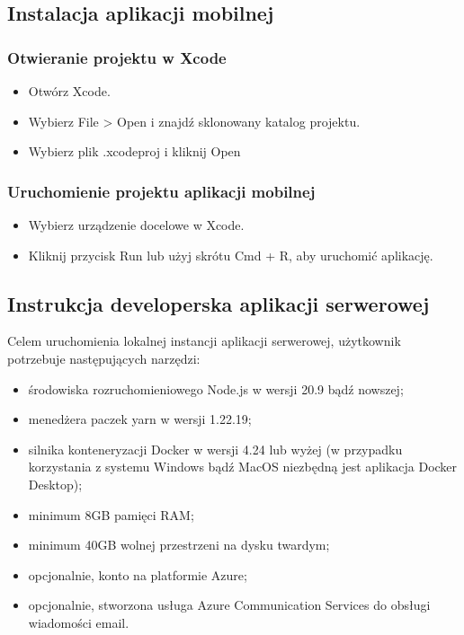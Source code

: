 \documentclass[12pt, a4paper, twoside, openany]{book}
\newcommand{\forceindent}{\leavevmode{\parindent=1.3em\indent}}
\begin{document}
{\subsection{Instalacja aplikacji mobilnej}

\subsubsection{Otwieranie projektu w Xcode }
\begin{itemize}[label=--]
    \item Otwórz Xcode.
    \item Wybierz File > Open i znajdź sklonowany katalog projektu.
    \item Wybierz plik .xcodeproj i kliknij Open
\end{itemize}

\subsubsection{Uruchomienie projektu aplikacji mobilnej}
\begin{itemize}
    \item Wybierz urządzenie docelowe w Xcode.
    \item Kliknij przycisk Run lub użyj skrótu Cmd + R, aby uruchomić aplikację.
\end{itemize}

\subsection{Instrukcja developerska aplikacji serwerowej}

\forceindent Celem uruchomienia lokalnej instancji aplikacji serwerowej, użytkownik potrzebuje następujących narzędzi:
\begin{itemize}[label=--]
    \item środowiska rozruchomieniowego Node.js w wersji 20.9 bądź nowszej;
    \item menedżera paczek yarn w wersji 1.22.19;
    \item silnika konteneryzacji Docker w wersji 4.24 lub wyżej (w przypadku korzystania z systemu Windows bądź MacOS niezbędną jest aplikacja Docker Desktop);
    \item minimum 8GB pamięci RAM;
    \item minimum 40GB wolnej przestrzeni na dysku twardym;
    \item opcjonalnie, konto na platformie Azure;
    \item opcjonalnie, stworzona usługa Azure Communication Services do obsługi wiadomości email.
\end{itemize}

}
\end{document}
